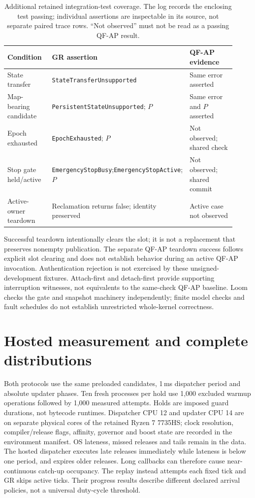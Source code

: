 \begin{table}[!ht]
\caption{Additional retained integration-test coverage. The log records the enclosing test passing; individual assertions are inspectable in its source, not separate paired trace rows. ``Not observed'' must not be read as a passing QF-AP result.}
\label{tab:extra-faults}
\centering\small
\begin{tabular}{@{}p{0.23\linewidth}p{0.39\linewidth}p{0.30\linewidth}@{}}
\toprule
Condition & GR assertion & QF-AP evidence\\\midrule
State transfer & \texttt{StateTransferUnsupported} & Same error asserted\\
Map-bearing candidate & \texttt{PersistentStateUnsupported}; $P$ & Same error and $P$ asserted\\
Epoch exhausted & \texttt{EpochExhausted}; $P$ & Not observed; shared check\\
Stop gate held/active & \texttt{EmergencyStopBusy};\newline \texttt{EmergencyStopActive}; $P$ & Not observed; shared commit\\
Active-owner teardown & Reclamation returns false; identity preserved & Active case not observed\\
\bottomrule
\end{tabular}
\end{table}

Successful teardown intentionally clears the slot; it is not a replacement that preserves nonempty publication. The separate QF-AP teardown success follows explicit slot clearing and does not establish behavior during an active QF-AP invocation. Authentication rejection is not exercised by these unsigned-development fixtures. Attach-first and detach-first provide supporting interruption witnesses, not equivalents to the same-check QF-AP baseline. Loom checks the gate and snapshot machinery independently; finite model checks and fault schedules do not establish unrestricted whole-kernel correctness.


\section{Hosted measurement and complete distributions}
\label{app:measurement}
Both protocols use the same preloaded candidates, 1\,ms dispatcher period and absolute updater phases. Ten fresh processes per hold use 1,000 excluded warmup operations followed by 1,000 measured attempts. Holds are imposed guard durations, not bytecode runtimes. Dispatcher CPU 12 and updater CPU 14 are on separate physical cores of the retained Ryzen 7 7735HS; clock resolution, compiler/release flags, affinity, governor and boost state are recorded in the environment manifest. OS lateness, missed releases and tails remain in the data. The hosted dispatcher executes late releases immediately while lateness is below one period, and expires older releases. Long callbacks can therefore cause near-continuous catch-up occupancy. The replay instead attempts each fixed tick and GR skips active ticks. Their progress results describe different declared arrival policies, not a universal duty-cycle threshold.

